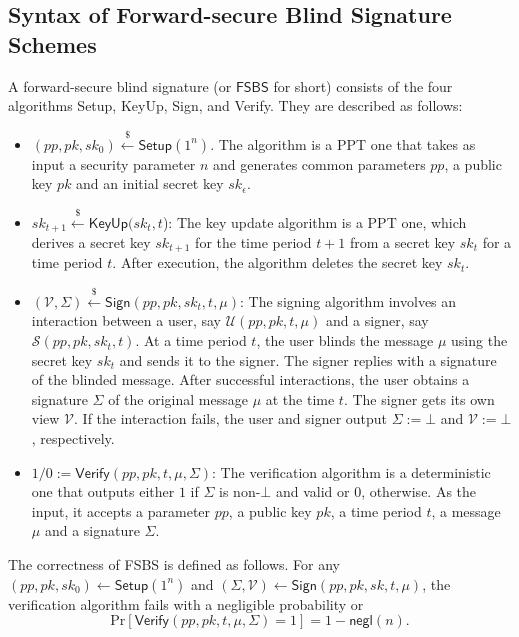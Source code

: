 \documentclass[runningheads]{llncs}
\def\Pr{\mathrm{Pr}}
\begin{document}
\subsection{Syntax of Forward-secure Blind Signature Schemes} \label{brs}
A forward-secure blind signature (or $\textsf{FSBS}$ for short) consists of 
the four algorithms \textsf{Setup}, \textsf{KeyUp}, \textsf{Sign}, and \textsf{Verify}. 
They are described as follows:
\begin{itemize}
	\item $(pp, pk,sk_0) \xleftarrow{\$} \textsf{Setup}(1^{n})$. 
	The algorithm is a PPT one that takes as input a security 
	parameter $n$ and 
	generates common parameters $pp$, a public key $pk$  and an initial secret key $sk_\epsilon$. 
	\item $sk_{t+1} \xleftarrow{\$} \textsf{KeyUp}(sk_{t}, t$): 
	The key update algorithm is a PPT one, which derives
	a secret key $sk_{t+1}$ for the time period $t+1$ from a secret key 
	$sk_{t}$ for a time period $t$. 
	After execution,
	the algorithm deletes the secret key  $sk_t$.
	
	\item $( \mathcal{V}, \Sigma) \xleftarrow{\$} \textsf{Sign}(pp, pk, sk_t,t,\mu)$:  
	The signing algorithm involves an interaction between a user, say $\mathcal{U}(pp, pk, t, \mu)$ 
	and a signer, say $\mathcal{S}(pp, pk, sk_t, t)$. 
	At a time period $t$, the user  blinds the message $\mu$ using the secret key $sk_t$ and sends
	it to the signer. The signer replies with a signature of the blinded message.
	After successful interactions, the user obtains a signature $\Sigma$ of the original message $\mu$
	at the time $t$. The signer gets its own view $\mathcal{V}$. 
	 If the interaction fails, the user and signer output $\Sigma:=\bot$ and $\mathcal{V}:=\bot$, respectively.
	\item $1/0 := \textsf{Verify}(pp, pk, t, \mu, \Sigma)$: 
	The verification algorithm is a deterministic one that outputs either $1$ if $\Sigma$ is non-$\bot$ and valid 
	or $0$, otherwise. As the input, it accepts a parameter $pp$, a public key $pk$, a time period $t$, 
	a message $\mu$ and a signature $\Sigma$.
\end{itemize}
%
\noindent
The correctness of \textsf{FSBS} is defined as follows.
For  any $ (pp, pk,sk_0) \leftarrow \textsf{Setup}(1^{n})$ and $ 
(\Sigma, \mathcal{V}) \leftarrow \textsf{Sign}(pp, pk,sk, t,\mu)$, 
the verification algorithm fails with a negligible probability or
\[
\Pr[\textsf{Verify}(pp,pk,t, \mu, \Sigma)=1]=1-\textsf{negl}(n).
\]
%
\end{document}
